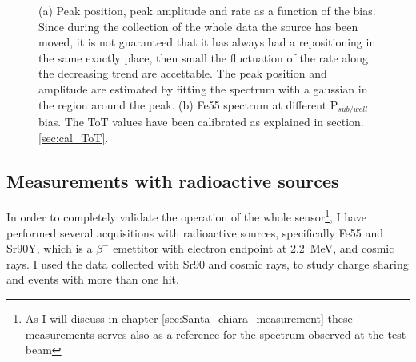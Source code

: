\begin{figure}
\begin{subfigure}[b]{0.49\textwidth}
                \caption{}
                \label{fig:}
            \end{subfigure}
            \caption{(a) Peak position, peak amplitude and rate as a function of the bias. Since during the collection of the whole data the source has been moved, it is not guaranteed that it has always had a repositioning in the same exactly place, then small the fluctuation of the rate along the decreasing trend are accettable. The peak position and amplitude are estimated by fitting the spectrum with a gaussian in the region around the peak. (b) Fe55 spectrum at different P$_{sub/well}$ bias. The ToT values have been calibrated as explained in section. \ref{sec:cal_ToT}.}
            \label{fig:Fe_param_vs_bias}
            \end{figure}     

    \subsection{Measurements with radioactive sources}\label{sec:sources}
        In order to completely validate the operation of the whole sensor\footnote{As I will discuss in chapter \ref{sec:Santa_chiara_measurement} these measurements serves also as a reference for the spectrum observed at the test beam}, I have performed several acquisitions with radioactive sources, specifically Fe55 and Sr90Y, which is a $\beta^-$ emettitor with electron endpoint at \SI{2.2}{MeV}, and cosmic rays.
        I used the data collected with Sr90 and cosmic rays, to study charge sharing and events with more than one hit.

